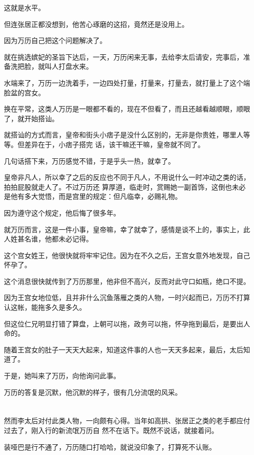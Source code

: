 \documentclass[11pt,a4paper,onecolumn]{article}
\begin{document}
这就是水平。

但连张居正都没想到，他苦心琢磨的这招，竟然还是没用上。

因为万历自己把这个问题解决了。

就在挑选嫔妃的圣旨下达后，一天，万历闲来无事，去给李太后请安，完事后，准备洗把脸，就叫人打盘水来。

水端来了，万历一边洗着手，一边四处打量，打量来，打量去，就打量上了这个端脸盆的宫女。

换在平常，这类人万历是一眼都不看的，现在不但看了，而且还越看越顺眼，顺眼了，就开始搭讪。

就搭讪的方式而言，皇帝和街头小痞子是没什么区别的，无非是你贵姓，哪里人等等。但差异在于，小痞子搭完
话，该干嘛还干嘛，皇帝就不同了。

几句话搭下来，万历感觉不错，于是乎头一热，就幸了。

皇帝非凡人，所以幸了之后的反应也不同于凡人，不用说什么一时冲动之类的话，拍拍屁股就走人了。不过万历还
算厚道，临走时，赏赐她一副首饰，这倒也未必是他有多大觉悟，而是宫里的规定：但凡临幸，必赐礼物。

因为遵守这个规定，他后悔了很多年。

就万历而言，这是一件小事，皇帝嘛，幸了就幸了，感情是谈不上的，事实上，此人姓甚名谁，他都未必记得。

这个宫女姓王，他很快就将牢牢记住。因为在不久之后，王宫女意外地发现，自己怀孕了。

这个消息很快就传到了万历那里，他非但不高兴，反而对此守口如瓶，绝口不提。

因为王宫女地位低，且并非什么沉鱼落雁之类的人物，一时兴起而已，万历不打算认这帐，能拖多久是多久。

但这位仁兄明显打错了算盘，上朝可以拖，政务可以拖，怀孕拖到最后，是要出人命的。

随着王宫女的肚子一天天大起来，知道这件事的人也一天天多起来，最后，太后知道了。

于是，她叫来了万历，向他询问此事。

万历的答复是沉默，他沉默的样子，很有几分流氓的风采。

\section[\thesection]{}

然而李太后对付此类人物，一向颇有心得。当年如高拱、张居正之类的老手都应付过去了，刚入行的新流氓万历自
然不在话下。既然不说话，就接着问。

装哑巴是行不通了，万历随口打哈哈，就说没印象了，打算死不认账。
\end{document}
